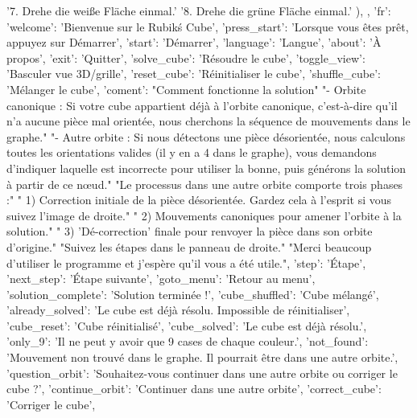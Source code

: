 {{            '7. Drehe die weiße Fläche einmal.\n'
            '8. Drehe die grüne Fläche einmal.'
        ),
    },
    'fr': {
        'welcome':         'Bienvenue sur le Rubik\'s Cube',
        'press_start':     'Lorsque vous êtes prêt, appuyez sur Démarrer',
        'start':           'Démarrer',
        'language':        'Langue',
        'about':           'À propos',
        'exit':            'Quitter',
        'solve_cube':      'Résoudre le cube',
        'toggle_view':     'Basculer vue 3D/grille',
        'reset_cube':      'Réinitialiser le cube',
        'shuffle_cube':    'Mélanger le cube',
        'coment':          "Comment fonctionne la solution\n\n"
                            "- Orbite canonique : Si votre cube appartient déjà à l'orbite canonique, c'est-à-dire qu'il n'a aucune pièce mal orientée, nous cherchons la séquence de mouvements dans le graphe.\n"
                            "- Autre orbite : Si nous détectons une pièce désorientée, nous calculons toutes les orientations valides (il y en a 4 dans le graphe), vous demandons d'indiquer laquelle est incorrecte pour utiliser la bonne, puis générons la solution à partir de ce nœud.\n\n"
                            "Le processus dans une autre orbite comporte trois phases :\n"
                            "  1) Correction initiale de la pièce désorientée. Gardez cela à l'esprit si vous suivez l'image de droite.\n"
                            "  2) Mouvements canoniques pour amener l'orbite à la solution.\n"
                            "  3) 'Dé-correction' finale pour renvoyer la pièce dans son orbite d'origine.\n\n"
                            "Suivez les étapes dans le panneau de droite.\n\n"
                            "Merci beaucoup d'utiliser le programme et j'espère qu'il vous a été utile.\n\n",
        'step':          'Étape',
        'next_step':       'Étape suivante',
        'goto_menu':       'Retour au menu',
        'solution_complete': 'Solution terminée !',
        'cube_shuffled':   'Cube mélangé',
        'already_solved':  'Le cube est déjà résolu. Impossible de réinitialiser',
        'cube_reset':      'Cube réinitialisé',
        'cube_solved':     'Le cube est déjà résolu.',
        'only_9':          'Il ne peut y avoir que 9 cases de chaque couleur.',
        'not_found':       'Mouvement non trouvé dans le graphe. Il pourrait être dans une autre orbite.',
        'question_orbit':  'Souhaitez-vous continuer dans une autre orbite ou corriger le cube ?',
        'continue_orbit':  'Continuer dans une autre orbite',
        'correct_cube':    'Corriger le cube',
}}
